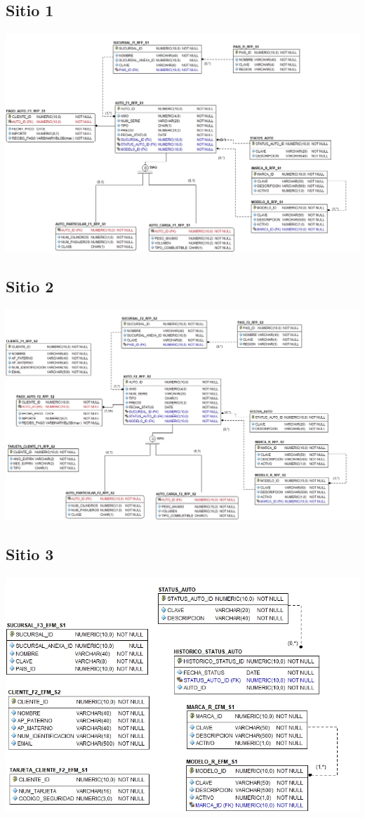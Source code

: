 \documentclass{article}
\begin{document}
\subsection*{Sitio 1}
\includegraphics[width=\linewidth]{modelo-n1}\\
\subsection*{Sitio 2}
\includegraphics[width=\linewidth]{modelo-n2}\\
\subsection*{Sitio 3}
\includegraphics[width=0.8\linewidth]{modelo-n3}\\
\end{document}
